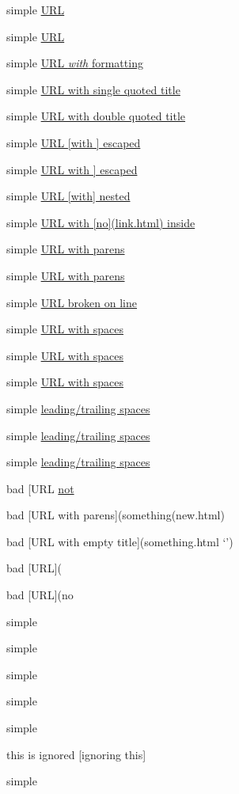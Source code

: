 simple \href{}{URL}

simple \href{something.html}{URL}

simple \href{something.html}{URL \emph{with} formatting}

simple \href{something.html}{URL with single quoted title}

simple \href{something.html}{URL with double quoted title}

simple \href{something.html}{URL [with ] escaped}

simple \href{something.html}{URL with ] escaped}

simple \href{something.html}{URL [with] nested}

simple \href{something.html}{URL with [no](link.html) inside}

simple \href{/something/to(do)}{URL with parens}

simple \href{/something/to(do}{URL with parens}

simple \href{something.html}{URL broken
on line}

simple \href{with spaces.html}{URL with spaces}

simple \href{with spaces.html}{URL with spaces}

simple \href{with (spaces).html}{URL with spaces}

simple \href{spaces.html}{leading/trailing spaces}

simple \href{spaces.html}{leading/trailing spaces}

simple \href{spaces.html}{leading/trailing spaces}

bad [URL \href{something.html}{not}

bad [URL with parens](something(new.html)

bad [URL with empty title](something.html `{}')

bad [URL](

bad [URL](no

simple 

simple 

simple 

simple 

simple 

this is ignored [ignoring this]

simple 
